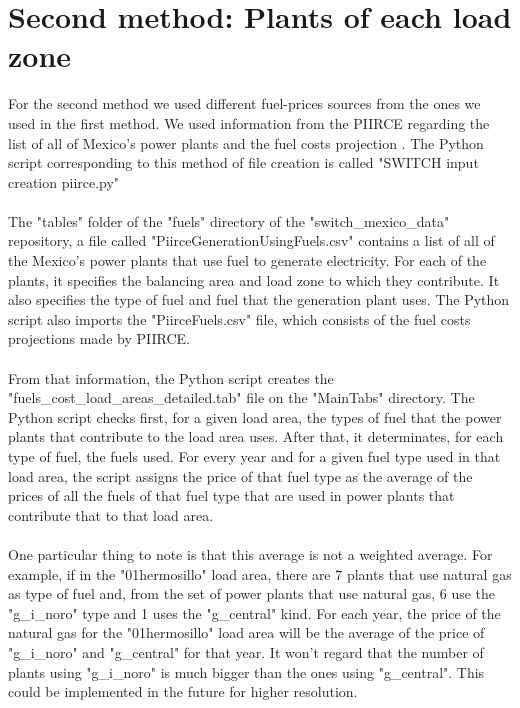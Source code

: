 \documentclass{article}
\begin{document}
\section{Second method: Plants of each load zone}
For the second method we used different fuel-prices sources from the ones we used in the first method. We used information from the PIIRCE regarding the list of all of Mexico's power plants\cite{piirceg} and the fuel costs projection \cite{piircef}. The Python script corresponding to this method of file creation is called "SWITCH input creation piirce.py"
\\
\\The "tables" folder of the "fuels" directory of the "switch\_mexico\_data" repository, a file called "PiirceGenerationUsingFuels.csv" contains a list of all of the Mexico's power plants that use fuel to generate electricity. For each of the plants, it specifies the balancing area and load zone to which they contribute. It also specifies the type of fuel and fuel that the generation plant uses. The Python script also imports the "PiirceFuels.csv" file, which consists of the fuel costs projections made by PIIRCE\cite{piircef}.
\\
\\From that information, the Python script creates the "fuels\_cost\_load\_areas\_detailed.tab" file on the "MainTabs" directory. The Python script checks first, for a given load area, the types of fuel that the power plants that contribute to the load area uses. After that, it determinates, for each type of fuel, the fuels used. For every year and for a given fuel type used in that load area, the script assigns the price of that fuel type as the average of the prices of all the fuels of that fuel type that are used in power plants that contribute that to that load area. 
\\
\\One particular thing to note is that this average is not a weighted average. For example, if in the "01\-hermosillo" load area, there are 7 plants that use natural gas as type of fuel and, from the set of power plants that use natural gas, 6 use the "g\_i\_noro" type and 1 uses the "g\_central"  kind. For each year, the price of the natural gas for the "01\-hermosillo" load area will be the average of the price of "g\_i\_noro" and "g\_central" for that year. It won't regard that the number of plants using "g\_i\_noro" is much bigger than the ones using "g\_central". This could be implemented in the future for higher resolution.
\end{document}
